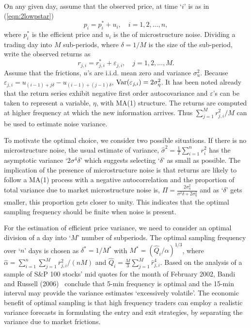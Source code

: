 On any given day, assume that the observed price, at time `$i$' is as in (\ref{eqn:2lowpstar})
	\begin{equation} \label{eqn:2pi2}
	p_i = p_i^* + u_i, \quad i= 1, 2, \ldots, n,
	\end{equation}
where $p_i^*$ is the efficient price and $u_i$ is the of microstructure noise. Dividing a trading day into $M$ sub-periods, where $\delta= 1/M$ is the size of the sub-period, write the observed returns as
	\begin{equation} \label{eqn:2rji2}
	r_{j,i} = r_{j,i}^* + \varepsilon_{j,i}, \quad j= 1,2,\ldots, M.
	\end{equation}
Assume that the frictions, $u$'s are i.i.d. mean zero and variance $\sigma_{u}^2$. Because $\varepsilon_{j,i}= u_{(i-1) + j \delta} - u_{(i-1) + (j-1)\delta}$, $\operatorname{Var}(\varepsilon_{j,i})= 2 \sigma_{\eta}^2$. It has been noted already that the return series exhibit negative first order autocovariance and $\varepsilon$'s can be taken to represent a variable, $\eta$, with MA(1) structure. The returns are computed at higher frequency at which the new information arrives. Thus $\sum_{j=1}^M r_{j,i}^2/M$ can be used to estimate noise variance. 


To motivate the optimal choice, we consider two possible situations. If there is no microstructure noise, the usual estimate of variance, $\hat{\sigma}^2= \frac{1}{T} \sum_{i=1}^n r_i^2$ has the asymptotic variance `$2\sigma^4 \delta$' which suggests selecting `$\delta$' as small as possible. The implication of the presence of microstructure noise is that returns are likely to follow a MA(1) process with a negative autocorrelation and the proportion of total variance due to market microstructure noise is, $\Pi= \frac{2\sigma_\eta^2}{\sigma^2\delta + 2\sigma_\eta^2}$ and as `$\delta$' gets smaller, this proportion gets closer to unity. This indicates that the optimal sampling frequency should be finite when noise is present.


For the estimation of efficient price variance, we need to consider an  optimal division of a day into `$M$' number of subperiods. The optimal sampling frequency over `$n$' days is chosen as $\delta^* = 1/M^*$ with $M^*= (\hat{Q}_i/\alpha)^{1/3}$, where $\hat{\alpha} = \sum_{i=1}^n \sum_{j=1}^M \overline{r}_{j,i}^2 / (nM)$ and $\hat{Q}_i = \frac{M}{3} \sum_{j=1}^M \hat{r}_{j,i}^4$. Based on the analysis of a sample of S\&P 100 stocks' mid quotes for the month of February 2002, Bandi and Russell (2006)~\cite{bandi} conclude that 5-min frequency is optimal and the 15-min interval may provide the variance estimates `excessively volatile'. The economic benefit of optimal sampling is that high frequency traders can employ a realistic variance forecasts in formulating the entry and exit strategies, by separating the variance due to market frictions. 



